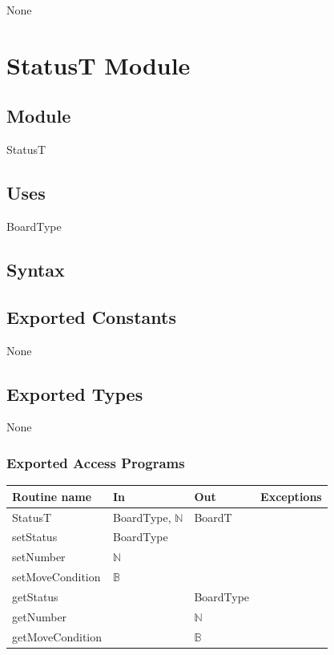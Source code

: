 \documentclass[12pt]{article}
\begin{document}
None

\newpage

\section* {StatusT Module}

\subsection* {Module}

StatusT

\subsection*{Uses}

BoardType

\subsection* {Syntax}

\subsection*{Exported Constants}

None

\subsection*{Exported Types}

None

\subsubsection* {Exported Access Programs}

\begin{tabular}{| l | l | l | p{6cm} |}

\hline
\textbf{Routine name} & \textbf{In} & \textbf{Out} & \textbf{Exceptions}\\
\hline
StatusT & BoardType, $\mathbb{N}$ & BoardT & \\
\hline
setStatus & BoardType &  & \\
\hline
setNumber & $\mathbb{N}$ &  & \\
\hline
setMoveCondition & $\mathbb{B}$ & & \\
\hline
getStatus &  & BoardType & \\
\hline
getNumber &  & $\mathbb{N}$ & \\
\hline
getMoveCondition &  & $\mathbb{B}$ & \\
\hline
 
\end{tabular}
\end{document}
